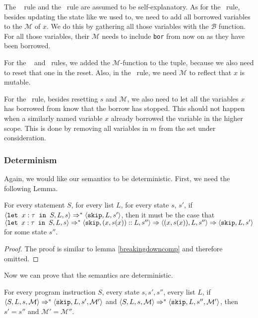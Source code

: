 The \loadsosb ~ rule and the \compsosb ~rule are assumed to be self-explanatory. As for the \asssosb ~rule, besides updating the state like we used to, we need to add all borrowed variables to the $\mathcal{M}$ of $x$. We do this by gathering all those variables with the $\mathcal{B}$ function. For all those variables, their $\mathcal{M}$ needs to include \texttt{bor} from now on as they have been borrowed. 

For the  ~ and  ~rules, we added the $\mathcal{M}$-function to the tuple, because we also need to reset that one in the reset. Also, in the  ~rule, we need $\mathcal{M}$ to reflect that $x$ is mutable. 

For the \setsosb ~rule, besides resetting $s$ and $\mathcal{M}$, we also need to let all the variables $x$ has borrowed from know that the borrow has stopped. This should not happen when a similarly named variable $x$ already borrowed the variable in the higher scope. This is done by removing all variables in $m$ from the set under consideration.  


\subsubsection*{Determinism}
Again, we would like our semantics to be deterministic. First, we need the following Lemma.

\begin{lemma}
\label{breakingdownletmut}
For every statement $S$, for every list $L$, for every state $s$, $s'$, if $\langle \texttt{let }x : \tau \texttt{ in } S, L, s \rangle \Rightarrow ^{*} \langle \texttt{skip}, L, s' \rangle$, then it must be the case that $\langle \texttt{let }x : \tau \texttt{ in } S, L, s \rangle \Rightarrow ^{*} \langle \texttt{skip}, (x,s(x))::L, s'' \rangle \Rightarrow \langle (x,s(x)), L, s'' \rangle \Rightarrow \langle \texttt{skip}, L, s' \rangle$ for some state $s''$. 
\end{lemma}

\begin{proof}
The proof is similar to lemma \ref{breakingdowncomp} and therefore omitted. 
\end{proof}

Now we can prove that the semantics are deterministic. 

\begin{theorem}
For every program instruction $S$, every state $s, s', s''$, every list $L$, if $\langle S, L, s, \mathcal{M} \rangle \Rightarrow ^{*} \langle \texttt{skip}, L, s', \mathcal{M'} \rangle$ and $\langle S, L, s, \mathcal{M} \rangle \Rightarrow ^{*} \langle \texttt{skip}, L, s'', \mathcal{M'} \rangle$, then $s' = s''$ and $\mathcal{M}' = \mathcal{M}''$.
\end{theorem}

